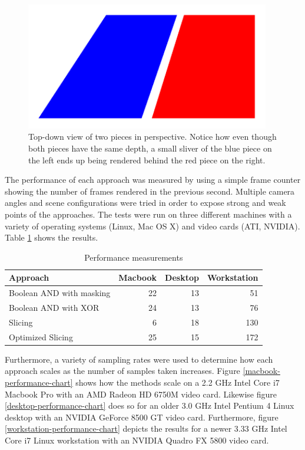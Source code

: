 \documentclass{report}
\begin{document}
\begin{figure}
\centering
\includegraphics[width=0.95\textwidth]{pieces-in-perspective.pdf}
\caption{Top-down view of two pieces in perspective.  Notice how even though
both pieces have the same depth, a small sliver of the blue piece on the left
ends up being rendered behind the red piece on the right.}
\label{pieces-in-perspective}
\end{figure}

The performance of each approach was measured by using a simple frame counter
showing the number of frames rendered in the previous second.  Multiple camera
angles and scene configurations were tried in order to expose strong and weak
points of the approaches.  The tests were run on three different machines with a
variety of operating systems (Linux, Mac OS X) and video cards (ATI, NVIDIA).
Table \ref{performance-table} shows the results.

\begin{table}
  \centering
  \begin{tabular}{ l r r r }
    \toprule
    Approach & Macbook & Desktop & Workstation\\
    \midrule
    Boolean AND with masking & 22 & 13 & 51 \\
    Boolean AND with XOR & 24 & 13 & 76 \\
    Slicing & 6 & 18 & 130 \\
    Optimized Slicing & 25 & 15 & 172 \\
    \bottomrule
  \end{tabular}
  \caption{Performance measurements}
  \label{performance-table}
\end{table}

Furthermore, a variety of sampling rates were used to determine how each
approach scales as the number of samples taken increases.  Figure
\ref{macbook-performance-chart} shows how the methods scale on a 2.2 GHz Intel
Core i7 Macbook Pro with an AMD Radeon HD 6750M video card.  Likewise figure
\ref{desktop-performance-chart} does so for an older 3.0 GHz Intel Pentium 4
Linux desktop with an NVIDIA GeForce 8500 GT video card.  Furthermore, figure
\ref{workstation-performance-chart} depicts the results for a newer 3.33 GHz
Intel Core i7 Linux workstation with an NVIDIA Quadro FX 5800 video card.
\end{document}
